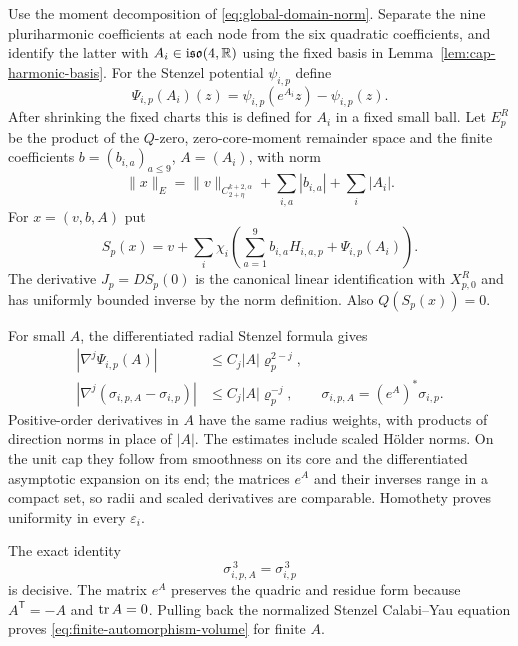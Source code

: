 Use the moment decomposition of
\eqref{eq:global-domain-norm}. Separate the nine
pluriharmonic coefficients at each node from the
six quadratic coefficients, and identify the
latter with $A_i\in\mathrm i\mathfrak{so}(4,\mathbb R)$
using the fixed basis in
Lemma~\ref{lem:cap-harmonic-basis}. For the Stenzel
potential $\psi_{i,p}$ define
\[
 \Psi_{i,p}(A_i)(z)
       =\psi_{i,p}(e^{A_i}z)-\psi_{i,p}(z).
\]
After shrinking the fixed charts this is defined
for $A_i$ in a fixed small ball. Let $E_p^R$ be
the product of the $Q$-zero, zero-core-moment
remainder space and the finite coefficients
$b=(b_{i,a})_{a\le9}$, $A=(A_i)$, with norm
\[
 \|x\|_E=\|v\|_{C^{k+2,\alpha}_{2+\eta}}
                         +\sum_{i,a}|b_{i,a}|+\sum_i|A_i|.
\]
For $x=(v,b,A)$ put
\begin{equation}\label{eq:nonlinear-potential-map}
 S_p(x)=v+\sum_i\chi_i
       \left(\sum_{a=1}^9b_{i,a}H_{i,a,p}
                             +\Psi_{i,p}(A_i)\right).
\end{equation}
The derivative $J_p=DS_p(0)$ is the canonical
linear identification with $X_{p,0}^R$ and has
uniformly bounded inverse by the norm definition.
Also $Q(S_p(x))=0$.

For small $A$, the differentiated radial Stenzel
formula gives
\begin{equation}\label{eq:finite-automorphism-bounds}
 \begin{split}
 |\nabla^j\Psi_{i,p}(A)|
       &\le C_j|A|\varrho_p^{2-j},\\
 |\nabla^j(\sigma_{i,p,A}-\sigma_{i,p})|
       &\le C_j|A|\varrho_p^{-j},
 \qquad \sigma_{i,p,A}=(e^A)^*\sigma_{i,p}.
 \end{split}
\end{equation}
Positive-order derivatives in $A$ have the same
radius weights, with products of direction norms
in place of $|A|$. The estimates include scaled
Hölder norms. On the unit cap they follow from
smoothness on its core and the differentiated
asymptotic expansion on its end; the matrices
$e^A$ and their inverses range in a compact set,
so radii and scaled derivatives are comparable.
Homothety proves uniformity in every
$\varepsilon_i$.

The exact identity
\begin{equation}\label{eq:finite-automorphism-volume}
 \sigma_{i,p,A}^{\,3}=\sigma_{i,p}^{\,3}
\end{equation}
is decisive. The matrix $e^A$ preserves the
quadric and residue form because
$A^{\mathsf T}=-A$ and $\operatorname{tr} A=0$. Pulling back
the normalized Stenzel Calabi--Yau equation
proves \eqref{eq:finite-automorphism-volume}
for finite $A$.

